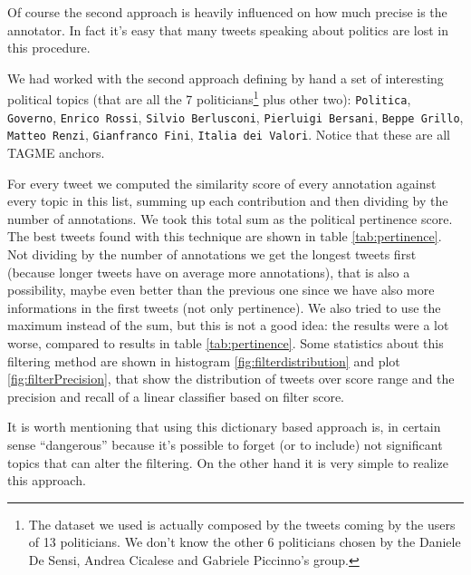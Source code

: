 \documentclass[a4paper,11pt,oneside]{article}
\begin{document}
Of course the second approach is heavily influenced on how much precise is the annotator. In fact it's easy that many tweets speaking about politics are lost in this procedure.

We had worked with the second approach defining by hand a set of interesting political topics (that are all the 7 politicians\footnote{The dataset we used is actually composed by the tweets coming by the users of 13 politicians. We don't know the other 6 politicians chosen by the Daniele De Sensi, Andrea Cicalese and Gabriele Piccinno's group.} plus other two): \texttt{Politica}, \texttt{Governo}, \texttt{Enrico Rossi}, \texttt{Silvio Berlusconi}, \texttt{Pierluigi Bersani}, \texttt{Beppe Grillo}, \texttt{Matteo Renzi}, \texttt{Gianfranco Fini}, \texttt{Italia dei Valori}. Notice that these are all TAGME anchors.

For every tweet we computed the similarity score of every annotation against every topic in this list, summing up each contribution and then dividing by the number of annotations. We took this total sum as the political pertinence score. The best tweets found with this technique are shown in table \ref{tab:pertinence}.
Not dividing by the number of annotations we get the longest tweets first (because longer tweets have on average more annotations), that is also a possibility, maybe even better than the previous one since we have also more informations in the first tweets (not only pertinence). We also tried to use the maximum instead of the sum, but this is not a good idea: the results were a lot worse, compared to results in table \ref{tab:pertinence}. Some statistics about this filtering method are shown in histogram \ref{fig:filterdistribution} and plot \ref{fig:filterPrecision}, that show the distribution of tweets over score range and the precision and recall of a linear classifier based on filter score.


It is worth mentioning that using this dictionary based approach is, in certain sense ``dangerous'' because it's possible to forget (or to include) not significant topics that can alter the filtering. On the other hand it is very simple to realize this approach.
\end{document}
